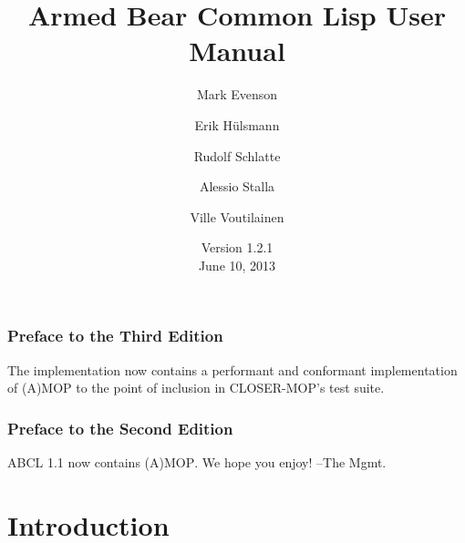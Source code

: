 \documentclass[10pt]{book}
\begin{document}
\title{Armed Bear Common Lisp User Manual}
\date{Version 1.2.1\\
\smallskip
June 10, 2013}
\author{Mark Evenson \and Erik H\"{u}lsmann \and Rudolf Schlatte \and
  Alessio Stalla \and Ville Voutilainen}

\maketitle

\tableofcontents

\subsection{Preface to the Third Edition}
The implementation now contains a performant and conformant
implementation of (A)MOP to the point of inclusion in CLOSER-MOP's
test suite.


\subsection{Preface to the Second Edition}

\textsc{ABCL} 1.1 now contains \textsc{(A)MOP}.  We hope you enjoy!  --The Mgmt.

\chapter{Introduction}
\end{document}
